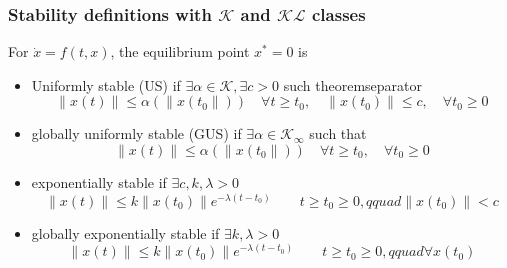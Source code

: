 \documentclass{article}
\begin{document}
\subsubsection{Stability definitions with $\mathcal{K}$ and $\mathcal{KL}$ classes}
For $\dot x = f(t,x)$, the equilibrium point $x^* = 0$ is
\begin{itemize}
	\item Uniformly stable (US) if $\exists \alpha \in \mathcal{K}, \exists c > 0$ such
	      theoremseparator
	      \begin{equation*}
		      \| x(t) \| \leq \alpha(\|x(t_0\|)) \quad \forall t \geq t_0, \quad \|x(t_0)\| \leq c, \quad \forall t_0 \geq 0
	      \end{equation*}
	\item globally uniformly stable (GUS) if $\exists \alpha \in \mathcal{K}_{\infty}$
	      such that
	      \begin{equation*}
		      \| x(t) \| \leq \alpha(\|x(t_0\|)) \quad \forall t \geq t_0, \quad \forall t_0 \geq 0
	      \end{equation*}
	\item exponentially stable if $\exists c,k, \lambda > 0$
	      \begin{equation*}
		      \|x(t)\| \leq k \|x(t_0)\|e^{-\lambda(t-t_0)} \qquad t \geq t_0 \geq 0, qquad \|x(t_0)\| < c
	      \end{equation*}
	\item globally exponentially stable if $\exists k, \lambda > 0$
	      \begin{equation*}
		      \|x(t)\| \leq k \|x(t_0)\|e^{-\lambda(t-t_0)} \qquad t \geq t_0 \geq 0, qquad \forall x(t_0)
	      \end{equation*}
\end{itemize}
\end{document}
